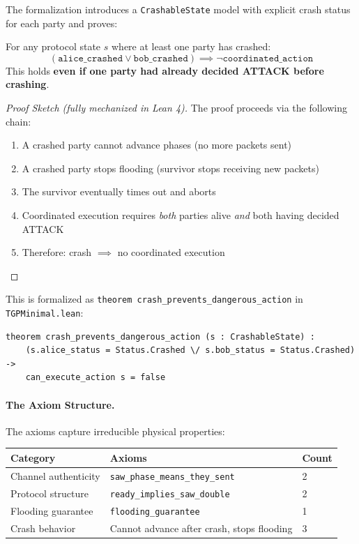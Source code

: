 The formalization introduces a \texttt{CrashableState} model with explicit crash status for each party and proves:

\begin{theorem}
\label{thm:crash-safety}
For any protocol state $s$ where at least one party has crashed:
\[
(\texttt{alice\_crashed} \lor \texttt{bob\_crashed}) \implies \neg\texttt{coordinated\_action}
\]
This holds \textbf{even if one party had already decided ATTACK before crashing}.
\end{theorem}

\begin{proof}[Proof Sketch (fully mechanized in Lean 4)]
The proof proceeds via the following chain:
\begin{enumerate}
    \item A crashed party cannot advance phases (no more packets sent)
    \item A crashed party stops flooding (survivor stops receiving new packets)
    \item The survivor eventually times out and aborts
    \item Coordinated execution requires \emph{both} parties alive \emph{and} both having decided ATTACK
    \item Therefore: crash $\implies$ no coordinated execution
\end{enumerate}
\end{proof}

This is formalized as \texttt{theorem crash\_prevents\_dangerous\_action} in \texttt{TGPMinimal.lean}:
\begin{verbatim}
theorem crash_prevents_dangerous_action (s : CrashableState) :
    (s.alice_status = Status.Crashed \/ s.bob_status = Status.Crashed) ->
    can_execute_action s = false
\end{verbatim}

\paragraph{The Axiom Structure.}
The axioms capture irreducible physical properties:

\begin{center}
\begin{tabular}{lp{6cm}l}
\toprule
\textbf{Category} & \textbf{Axioms} & \textbf{Count} \\
\midrule
Channel authenticity & \texttt{saw\_phase\_means\_they\_sent} & 2 \\
Protocol structure & \texttt{ready\_implies\_saw\_double} & 2 \\
Flooding guarantee & \texttt{flooding\_guarantee} & 1 \\
Crash behavior & Cannot advance after crash, stops flooding & 3 \\
\bottomrule
\end{tabular}
\end{center}

